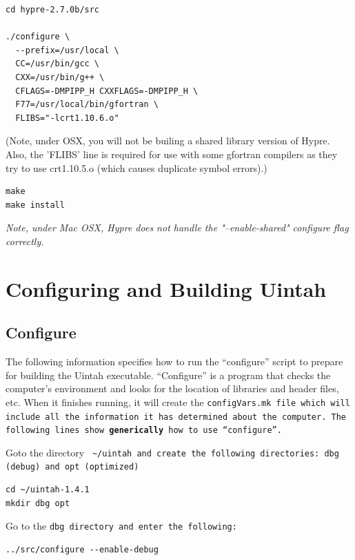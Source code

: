 \documentclass[12pt]{article}
\newcommand{\TT}[1]{\tt{#1} \normalfont}
\begin{document}
\begin{verbatim}
cd hypre-2.7.0b/src

./configure \
  --prefix=/usr/local \
  CC=/usr/bin/gcc \
  CXX=/usr/bin/g++ \
  CFLAGS=-DMPIPP_H CXXFLAGS=-DMPIPP_H \
  F77=/usr/local/bin/gfortran \
  FLIBS="-lcrt1.10.6.o"

\end{verbatim}

(Note, under OSX, you will not be builing a shared library version of
Hypre.  Also, the 'FLIBS' line is required for use with some gfortran
compilers as they try to use crt1.10.5.o (which causes duplicate
symbol errors).)

\begin{verbatim}
make
make install
\end{verbatim}

\emph{Note, under Mac OSX, Hypre does not handle the "--enable-shared" configure
  flag correctly.}

\section{Configuring and Building Uintah}

\subsection{Configure}

The following information specifies how to run the ``configure''
script to prepare for building the Uintah executable.  ``Configure''
is a program that checks the computer's environment and looks for the
location of libraries and header files, etc.  When it finishes
running, it will create the \TT{configVars.mk} file which will include all
the information it has determined about the computer.  The following
lines show \textbf{generically} how to use ``configure''.

Goto the directory \TT{ \textasciitilde/uintah} and create the
following directories: \TT{dbg} (debug) and \TT{opt} (optimized)

\begin{verbatim}
cd ~/uintah-1.4.1
mkdir dbg opt
\end{verbatim}

Go to the \TT{dbg} directory and enter the following:

\begin{verbatim}
../src/configure --enable-debug        
\end{verbatim}
\end{document}
